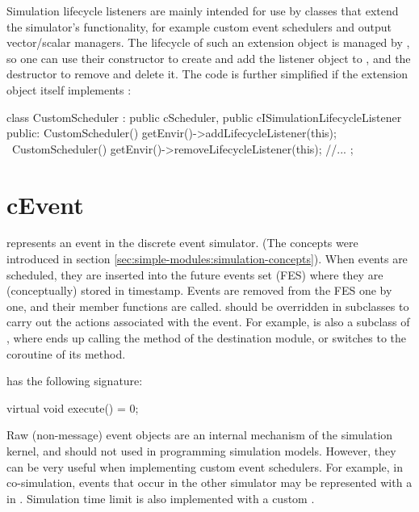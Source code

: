 Simulation lifecycle listeners are mainly intended for use by classes that
extend the simulator's functionality, for example custom event schedulers
and output vector/scalar managers. The lifecycle of such an extension
object is managed by {\opp}, so one can use their constructor to create and
add the listener object to , and the destructor to remove
and delete it. The code is further simplified if the extension object
itself implements :

\begin{cpp}
class CustomScheduler : public cScheduler, public cISimulationLifecycleListener
{
  public:
    CustomScheduler() { getEnvir()->addLifecycleListener(this); }
    ~CustomScheduler() { getEnvir()->removeLifecycleListener(this); }
    //...
};
\end{cpp}


\section{cEvent}
\label{sec:plugin-exts:cevent}

 represents an event in the discrete event simulator. (The
concepts were introduced in section \ref{sec:simple-modules:simulation-concepts}).
When events are scheduled, they are inserted into the future events set
(FES) where they are (conceptually) stored in timestamp. Events are removed
from the FES one by one, and their  member functions are
called.  should be overridden in subclasses to carry out
the actions associated with the event. For example,  is
also a subclass of , where  ends up calling
the  method of the destination module, or switches
to the coroutine of its  method.

 has the following signature:

\begin{cpp}
virtual void execute() = 0;
\end{cpp}

Raw (non-message) event objects are an internal mechanism of the {\opp}
simulation kernel, and should not used in programming simulation models.
However, they can be very useful when implementing custom event schedulers.
For example, in co-simulation, events that occur in the other simulator may
be represented with a  in {\opp}. Simulation time limit
is also implemented with a custom .


